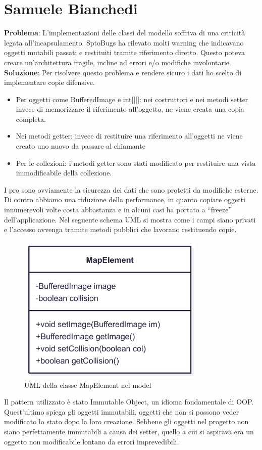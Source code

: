 \documentclass[a4paper,12pt]{report}
\begin{document}
\section{Samuele Bianchedi}
\textbf{Problema}: L'implementazioni delle classi del modello soffriva di una criticità legata all'incapsulamento. SptoBugs ha rilevato molti warning che indicavano oggetti mutabili passati e restituiti tramite riferimento diretto.
Questo poteva creare un'architettura fragile, incline ad errori e/o modifiche involontarie.
\textbf{Soluzione}: Per risolvere questo problema e rendere sicuro i dati ho scelto di implementare copie difensive.
\begin{itemize}
    \item Per oggetti come BufferedImage e int[][]: nei costruttori e nei metodi setter invece di memorizzare il riferimento all'oggetto, 
    ne viene creata una copia completa.
    \item Nei metodi getter: invece di restituire una riferimento all'oggetti ne viene creato uno nuovo da passare al chiamante
    \item Per le collezioni: i metodi getter sono stati modificato per restituire una vista immodificabile della collezione.
\end{itemize}
I pro sono ovviamente la sicurezza dei dati che sono protetti da modifiche esterne. Di contro abbiamo una riduzione della performance, 
in quanto copiare oggetti innumerevoli volte costa abbastanza e in alcuni casi ha portato a “freeze” dell'applicazione.
Nel seguente schema UML si mostra come i campi siano privati e l'accesso avvenga tramite metodi pubblici che lavorano restituendo copie.
\begin{figure}
    \centering
    \includegraphics[width=0.8\textwidth]{resources/UMLMapElement.png}
    \caption{UML della classe MapElement nel model}
    \label{}
\end{figure}
Il pattern utilizzato è stato Immutable Object, un idioma fondamentale di OOP. Quest'ultimo spiega gli oggetti immutabili, oggetti che non
si possono veder modificato lo stato dopo la loro creazione. Sebbene gli oggetti nel progetto non siano perfettamente immutabili a causa
dei setter, quello a cui si aspirava era un oggetto non modificabile lontano da errori imprevedibili.
\end{document}
